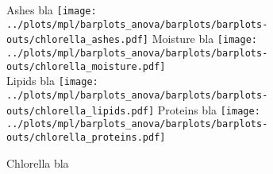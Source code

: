 
\begin{figure}[H]
\centering
	\subcaptionbox%
	{Ashes bla\label{subfig:chlorella_ashes}}%
		{\texttt{[image: ../plots/mpl/barplots\_anova/barplots/barplots-outs/chlorella\_ashes.pdf]}}%
\hfill
	\subcaptionbox%
	{Moisture bla\label{subfig:chlorella_moisture}}%
		{\texttt{[image: ../plots/mpl/barplots\_anova/barplots/barplots-outs/chlorella\_moisture.pdf]}}%
\\[2ex]
	\subcaptionbox%
	{Lipids bla\label{subfig:chlorella_lipids}}%
		{\texttt{[image: ../plots/mpl/barplots\_anova/barplots/barplots-outs/chlorella\_lipids.pdf]}}%
\hfill
	\subcaptionbox%
	{Proteins bla\label{subfig:chlorella_proteins}}%
		{\texttt{[image: ../plots/mpl/barplots\_anova/barplots/barplots-outs/chlorella\_proteins.pdf]}}%
\caption%
{Chlorella bla}
\label{fig:chlorellabla}
\end{figure}

